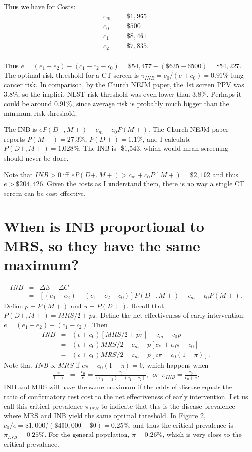 \documentclass[11pt]{article}
\begin{document}
Thus we have for Costs:
\begin{eqnarray*}
  c_m &=& \$1,965 \\
  c_0 &=& \$500 \\
  c_1 &=& \$8,461 \\
  c_2 &=& \$7,835. \\
\end{eqnarray*}

Thus $e=(e_1-e_2)-(c_1-c_2-c_0)=\$54,377-(\$625-\$500)=\$54,227$.  The optimal risk-threshold for a CT screen is $\pi_{INB}=c_0/(e+c_0)=0.91\%$ lung-cancer risk.  In comparison, by the Church NEJM paper, the 1st screen PPV  was 3.8\%, so the implicit NLST risk threshold was even lower than 3.8\%.  Perhaps it could be around 0.91\%, since average risk is probably much bigger than the minimum risk threshold. 

The INB is $eP(D+,M+)-c_m-c_0P(M+)$.  The Church NEJM paper reports $P(M+)=27.3\%$, $P(D+)=1.1\%$, and I calculate $P(D+,M+)=1.028\%$.  The INB is -\$1,543, which would mean screening should never be done.

Note that $INB>0$ iff $eP(D+,M+)>c_m+c_0P(M+)=\$2,102$ and thus $e>\$204,426$.  Given the costs as I understand them, there is no way a single CT screen can be cost-effective.


\section{When is INB proportional to MRS, so they have the same maximum?}

\begin{eqnarray*}
  INB &=& \Delta E - \Delta C\\
      &=& [(e_1-e_2)-(c_1-c_2-c_0)]P(D+,M+) - c_m - c_0P(M+).
\end{eqnarray*}
Define $p=P(M+)$ and $\pi=P(D+)$.  Recall that $P(D+,M+) = MRS/2 +p\pi$.  Define the net effectiveness of early intervention: $e = (e_1-e_2)-(c_1-c_2)$.  Then
\begin{eqnarray*}
  INB &=& (e+c_0)[MRS/2 + p\pi] - c_m - c_0p \\
      &=& (e+c_0)MRS/2 - c_m + p[e\pi + c_0\pi - c_0] \\
      &=& (e+c_0)MRS/2 - c_m + p[e\pi - c_0(1-\pi)].
\end{eqnarray*}
Note that $INB\propto MRS$ if $e\pi - c_0(1-\pi)=0$, which happens when
\begin{eqnarray*}
  \frac{\pi}{1-\pi} &=& \frac{c_0}{e} = \frac{c_0}{(e_1-e_2)-(c_1-c_2)},~~or~~\pi_{INB}=\frac{c_0}{c_0+e}.
\end{eqnarray*}
INB and MRS will have the same maximum if the odds of disease equals the ratio of confirmatory test cost to the net effectiveness of early intervention.  Let us call this critical prevalence $\pi_{INB}$ to indicate that this is the disease prevalence where MRS and INB yield the same optimal threshold.  In Figure 2, $c_0/e = \$1,000/(\$400,000-\$0) = 0.25\%$, and thus the critical prevalence is $\pi_{INB}=0.25\%$.  For the general population, $\pi=0.26\%$, which is very close to the critical prevalence.  
\end{document}
